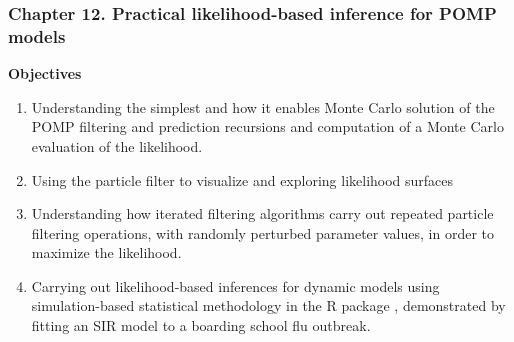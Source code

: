 \documentclass{beamer}\usepackage[]{graphicx}\usepackage[]{color}
\newcommand\CHAPTER{12}
\begin{document}









\begin{frame}[fragile]
\frametitle{Chapter \CHAPTER. Practical likelihood-based inference for POMP models}

\hspace{3cm} {\large \bf Objectives}

\vspace{3mm}

\begin{enumerate}

\item Understanding the simplest  and how it enables Monte Carlo solution of the POMP filtering and prediction recursions and computation of a Monte Carlo evaluation of the likelihood.

\item Using the particle filter to visualize and exploring likelihood surfaces 

\item Understanding how iterated filtering algorithms carry out repeated particle filtering operations, with randomly perturbed parameter values, in order to maximize the likelihood.

\item Carrying out likelihood-based inferences for dynamic models using simulation-based statistical methodology in the R package , demonstrated by fitting an SIR model to a boarding school flu outbreak.

\end{enumerate}

\end{frame}
\end{document}
